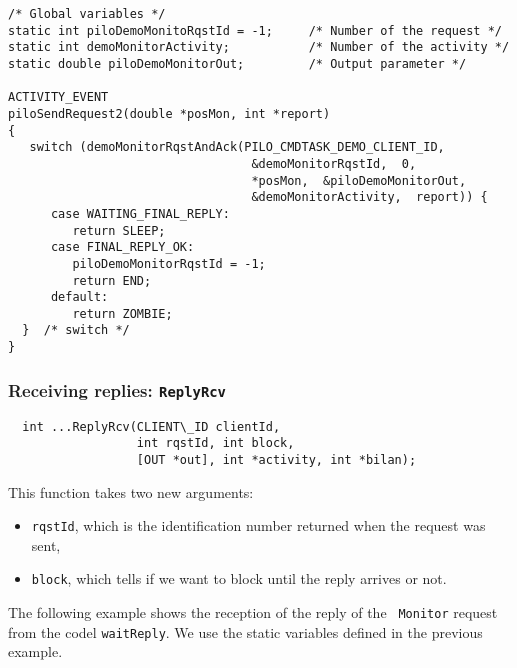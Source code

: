 \begin{center}\begin{cartouche}\small\begin{verbatim}
/* Global variables */
static int piloDemoMonitoRqstId = -1;     /* Number of the request */
static int demoMonitorActivity;           /* Number of the activity */
static double piloDemoMonitorOut;         /* Output parameter */

ACTIVITY_EVENT
piloSendRequest2(double *posMon, int *report)
{
   switch (demoMonitorRqstAndAck(PILO_CMDTASK_DEMO_CLIENT_ID, 
                                  &demoMonitorRqstId,  0,
                                  *posMon,  &piloDemoMonitorOut, 
                                  &demoMonitorActivity,  report)) {
      case WAITING_FINAL_REPLY:
         return SLEEP;
      case FINAL_REPLY_OK:
         piloDemoMonitorRqstId = -1;
         return END;
      default:
         return ZOMBIE;
  }  /* switch */
}
\end{verbatim}\end{cartouche}\end{center}


\subsubsection{Receiving replies: {\tt ReplyRcv}}

\begin{center}\begin{cartouche}\small\begin{verbatim}
  int ...ReplyRcv(CLIENT\_ID clientId,
                  int rqstId, int block,
                  [OUT *out], int *activity, int *bilan);
\end{verbatim}\end{cartouche}\end{center}

This function takes two new arguments:
\begin{itemize}
\item {\tt rqstId}, which is the identification number returned when the
request was sent,

\item {\tt block}, which tells if we want to block until the
reply arrives or not.
\end{itemize}

The  following  example shows the  reception   of the  reply of  the {\tt
Monitor}  request  from the codel   {\tt waitReply}.  We   use the static
variables defined in the previous example.


